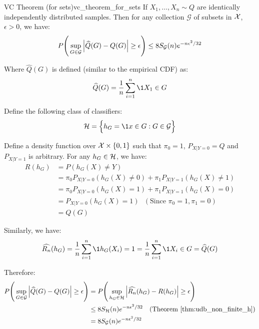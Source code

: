 \begin{theorem}{VC Theorem (for sets)}{vc_theorem_for_sets}
    If $X_1, \dots, X_n\sim Q$ are identically independently distributed samples. Then for any collection $\mathcal{G}$ of subsets in $\mathcal{X}$, $\epsilon>0$, we have:
    \begin{align*}
        P\Bigg( 
            \sup_{G\in\mathcal{G}} \Big| 
                \widehat{Q}(G) - Q(G) 
             \Big|\ge \epsilon
         \Bigg) \le 8S_\mathcal{G}(n)e^{-n\epsilon^2/32}
    \end{align*}

    \noindent Where $\widehat{Q}(G)$ is defined (similar to the empirical CDF) as:
    \begin{align*}
        \widehat{Q}(G) = \frac{1}{n}\sum_{i=1}^n \1{X_1\in G}
    \end{align*}
\end{theorem}

\begin{proof*}
    Define the following class of classifiers:
    \begin{align*}
        \Hf = \bigCurl{
            h_G = \1{x\in G} : G \in \mathcal{G}
        }
    \end{align*}

    \noindent Define a density function over $\mathcal{X}\times\{0,1\}$ such that $\pi_0=1$, $P_{X|Y=0}=Q$ and $P_{X|Y=1}$ is arbitrary. For any $h_G\in \mathcal{H}$, we have:
    \begin{align*}
        R(h_G) &= P(h_G(X) \ne Y) \\
        &= \pi_0P_{X|Y=0}(h_G(X) \ne 0) + \pi_1 P_{X|Y=1}(h_G(X) \ne 1) \\
        &= \pi_0P_{X|Y=0}(h_G(X) = 1) + \pi_1 P_{X|Y=1}(h_G(X) = 0) \\
        &= P_{X|Y=0}(h_G(X) = 1) \ \ \ (\text{Since } \pi_0=1, \pi_1=0)\\
        &= Q(G)
    \end{align*}

    \noindent Similarly, we have:
    \begin{align*}
        \widehat{R_n}(h_G) = \frac{1}{n}\sum_{i=1}^n \1{h_G(X_i) = 1} = \frac{1}{n}\sum_{i=1}^n \1{X_i\in G} = \widehat{Q}(G)
    \end{align*}

    \noindent Therefore:
    \begin{align*}
        P\Bigg( 
            \sup_{G\in\mathcal{G}} \Big| 
                \widehat{Q}(G) - Q(G) 
             \Big|\ge \epsilon
         \Bigg)
        &= 
        P\Bigg( 
            \sup_{h_G\in\mathcal{H}} \Big| 
                \widehat{R_n}(h_G) - R(h_G) 
             \Big|\ge \epsilon
         \Bigg) \\
        &\le 8S_{\mathcal{H}}(n)e^{-n\epsilon^2/32} \ \ \ (\text{Theorem }\ref{thm:udb_non_finite_h}) \\
        &= 8S_\mathcal{G}(n)e^{-n\epsilon^2/32}
    \end{align*}
\end{proof*}


